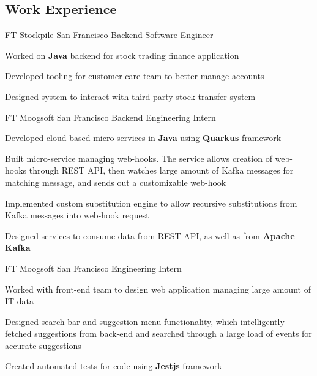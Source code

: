 \documentclass[10pt]{article}
\begin{document}
\begin{paracol}{2} %


\section{Work Experience}


{FT}
{Stockpile}
{San Francisco}
{Backend Software Engineer}
{}
{
\item Worked on \textbf{Java} backend for stock trading finance application
\item Developed tooling for customer care team to better manage accounts
\item Designed system to interact with third party stock transfer system
}

{FT}
{Moogsoft}
{San Francisco}
{Backend Engineering Intern}
{}
{
\item Developed cloud-based micro-services in \textbf{Java} using \textbf{Quarkus} framework
\item Built micro-service managing web-hooks. The service allows creation of web-hooks through REST API, then watches large amount of Kafka messages for matching message, and sends out a customizable web-hook
\item Implemented custom substitution engine to allow recursive substitutions from Kafka messages into web-hook request
\item Designed services to consume data from REST API, as well as from \textbf{Apache Kafka}
}

{FT}
{Moogsoft}
{San Francisco}
{Engineering Intern}
{}
{
\item Worked with front-end team to design web application managing large amount of IT data
\item Designed search-bar and suggestion menu functionality, which intelligently fetched suggestions from back-end and searched through a large load of events for accurate suggestions
\item Created automated tests for code using \textbf{Jestjs} framework
}


\end{paracol}
\end{document}
